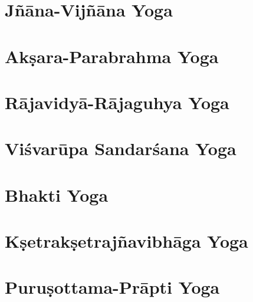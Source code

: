 \documentclass{scrbook}
\begin{document}
\chapter{Jñāna-Vijñāna Yoga}
\begin{multicols}{2}
    
\end{multicols}

\chapter{Akṣara-Parabrahma Yoga}
\begin{multicols}{2}
    
\end{multicols}

\chapter{Rājavidyā-Rājaguhya Yoga}
\begin{multicols}{2}
    
\end{multicols}

\setcounter{chapter}{10}

\chapter{Viśvarūpa Sandarśana Yoga}
\begin{multicols}{2}
    
\end{multicols}

\chapter{Bhakti Yoga}
\begin{multicols}{2}
    
\end{multicols}

\chapter{Kṣetrakṣetrajñavibhāga Yoga}
\begin{multicols}{2}
    
\end{multicols}

\setcounter{chapter}{14}

\chapter{Puruṣottama-Prāpti Yoga}
\begin{multicols}{2}
    
\end{multicols}
\end{document}
